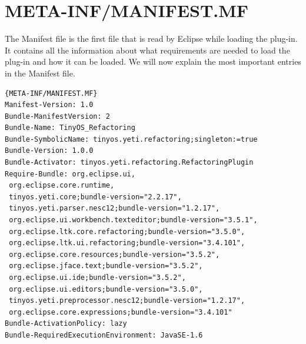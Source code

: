 \documentclass[a4paper,10pt]{report}
\begin{document}
\section{META-INF/MANIFEST.MF}
The Manifest file is the first file that is read by Eclipse while loading the plug-in. It contains all the information about what requirements 
are needed to load the plug-in and how it can be loaded. We will now explain the most important entries in the Manifest file.

\begin{lstlisting}[caption=MANIFEST]{META-INF/MANIFEST.MF}
Manifest-Version: 1.0
Bundle-ManifestVersion: 2
Bundle-Name: TinyOS_Refactoring
Bundle-SymbolicName: tinyos.yeti.refactoring;singleton:=true
Bundle-Version: 1.0.0
Bundle-Activator: tinyos.yeti.refactoring.RefactoringPlugin
Require-Bundle: org.eclipse.ui,
 org.eclipse.core.runtime,
 tinyos.yeti.core;bundle-version="2.2.17",
 tinyos.yeti.parser.nesc12;bundle-version="1.2.17",
 org.eclipse.ui.workbench.texteditor;bundle-version="3.5.1",
 org.eclipse.ltk.core.refactoring;bundle-version="3.5.0",
 org.eclipse.ltk.ui.refactoring;bundle-version="3.4.101",
 org.eclipse.core.resources;bundle-version="3.5.2",
 org.eclipse.jface.text;bundle-version="3.5.2",
 org.eclipse.ui.ide;bundle-version="3.5.2",
 org.eclipse.ui.editors;bundle-version="3.5.0",
 tinyos.yeti.preprocessor.nesc12;bundle-version="1.2.17",
 org.eclipse.core.expressions;bundle-version="3.4.101"
Bundle-ActivationPolicy: lazy
Bundle-RequiredExecutionEnvironment: JavaSE-1.6
\end{lstlisting}
\end{document}
